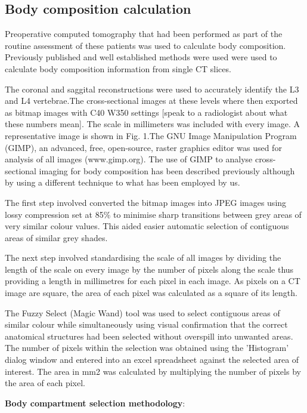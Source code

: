 \subsection{Body composition calculation}
Preoperative computed tomography that had been performed as part of the routine assessment of these patients was used to calculate body composition. Previously published and well established methods were used were used to calculate body composition information from single CT slices.\parencite{bredella_comparison_2010,shen_total_2004}

The coronal and saggital reconstructions were used to accurately identify the L3 and L4 vertebrae.The cross-sectional images at these levels where then exported as bitmap images with C40 W350 settings [speak to a radiologist about what these numbers mean]. The scale in millimeters was included with every image. A representative image is shown in Fig. 1.The GNU Image Manipulation Program (GIMP), an advanced, free, open-source, raster graphics editor was used for analysis of all images (www.gimp.org). The use of GIMP to analyse cross-sectional imaging for body composition has been described previously although by using a different technique to what has been employed by us. \parencite{anblagan_measurement_2013}

The first step involved converted the bitmap images into JPEG images using lossy compression set at 85\% to minimise sharp transitions between grey areas of very similar colour values. This aided easier automatic selection of contiguous areas of similar grey shades. 

The next step involved standardising the scale of all images by dividing the length of the scale on every image by the number of pixels along the scale thus providing a length in millimetres for each pixel in each image. As pixels on a CT image are square, the area of each pixel was calculated as a square of its length.

The Fuzzy Select (Magic Wand) tool was used to select contiguous areas of similar colour while simultaneously using visual confirmation that the correct anatomical structures had been selected without overspill into unwanted areas. The number of pixels within the selection was obtained using the 'Histogram' dialog window and entered into an excel spreadsheet against the selected area of interest. The area in mm2 was calculated by multiplying the number of pixels by the area of each pixel.

\textbf{Body compartment selection methodology}:

